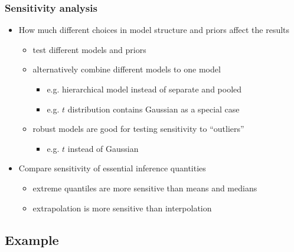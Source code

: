 \documentclass[10pt]{beamer}
\begin{document}
\begin{frame}

\frametitle{Sensitivity analysis}

  \begin{itemize}
  \item How much different choices in model structure and priors affect the results
    \begin{itemize}
      \item<2-> test different models and priors
      \item<3-> alternatively combine different models to one model
        \begin{itemize}
        \item e.g. hierarchical model instead of separate and pooled
        \item e.g. $t$ distribution contains Gaussian as a special case
      \end{itemize}
      \item<3-> robust models are good for testing sensitivity to ``outliers''
        \begin{itemize}
        \item e.g. $t$ instead of Gaussian
        \end{itemize}
    \end{itemize}
    \item<4-> Compare sensitivity of essential inference quantities
      \begin{itemize}
      \item extreme quantiles are more sensitive than means and medians
      \item extrapolation is more sensitive than interpolation
      \end{itemize}
    \end{itemize}

\end{frame}

\subsection{Example}
\frame{\subsectionpage}
\end{document}
